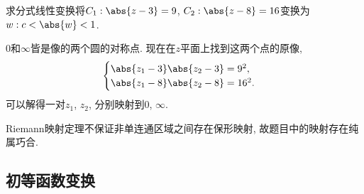 \documentclass[../ComplexVariable.tex]{subfiles}
\begin{document}
\begin{sample}
    \begin{ex}
        求分式线性变换将$C_1: \abs{z-3} = 9$, $C_2: \abs{z-8} = 16$变换为$w: c<\abs{w}<1$.
    \end{ex}
    \begin{solution}
        $0$和$\infty$皆是像的两个圆的对称点. 现在在$z$平面上找到这两个点的原像,
        \[ \begin{cases}
            \abs{z_1-3}\abs{z_2-3} = 9^2,\\
            \abs{z_1-8}\abs{z_2-8} = 16^2.
        \end{cases} \]
        可以解得一对$z_1$, $z_2$, 分别映射到$0$, $\infty$.
    \end{solution}
    \begin{remark}
        Riemann映射定理不保证非单连通区域之间存在保形映射, 故题目中的映射存在纯属巧合.
    \end{remark}
\end{sample}


\subsection{初等函数变换} %
\label{sub:初等函数变换}
\end{document}

